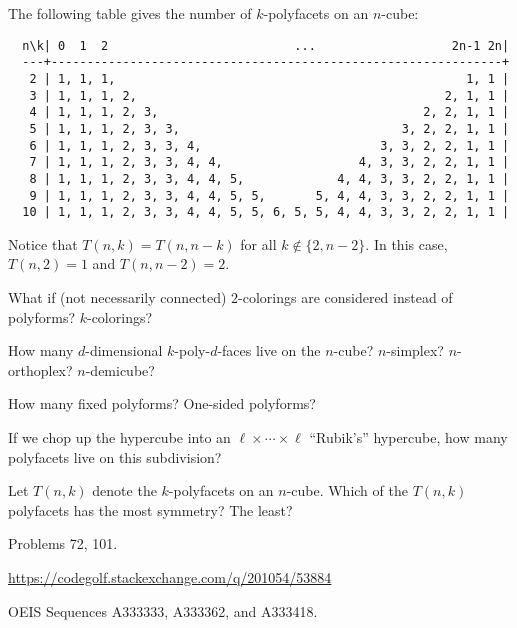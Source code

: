 \documentclass{article}
\begin{document}
\begin{note}
  The following table gives the number of $k$-polyfacets on an $n$-cube:
  \begin{verbatim}
  n\k| 0  1  2                          ...                   2n-1 2n|
  ---+---------------------------------------------------------------+
   2 | 1, 1, 1,                                                 1, 1 |
   3 | 1, 1, 1, 2,                                           2, 1, 1 |
   4 | 1, 1, 1, 2, 3,                                     2, 2, 1, 1 |
   5 | 1, 1, 1, 2, 3, 3,                               3, 2, 2, 1, 1 |
   6 | 1, 1, 1, 2, 3, 3, 4,                         3, 3, 2, 2, 1, 1 |
   7 | 1, 1, 1, 2, 3, 3, 4, 4,                   4, 3, 3, 2, 2, 1, 1 |
   8 | 1, 1, 1, 2, 3, 3, 4, 4, 5,             4, 4, 3, 3, 2, 2, 1, 1 |
   9 | 1, 1, 1, 2, 3, 3, 4, 4, 5, 5,       5, 4, 4, 3, 3, 2, 2, 1, 1 |
  10 | 1, 1, 1, 2, 3, 3, 4, 4, 5, 5, 6, 5, 5, 4, 4, 3, 3, 2, 2, 1, 1 |
  \end{verbatim}
  Notice that $T(n,k) = T(n,n-k)$ for all $k \not\in \{2, n-2\}$. In this case,
  $T(n,2) = 1$ and $T(n,n-2) = 2$.
\end{note}

\begin{related}
  \item What if (not necessarily connected) $2$-colorings are considered instead of polyforms? $k$-colorings?
  \item How many $d$-dimensional $k$-poly-$d$-faces live on the $n$-cube? $n$-simplex? $n$-orthoplex? $n$-demicube?
  \item How many fixed polyforms? One-sided polyforms?
  \item If we chop up the hypercube into an $\ell \times \cdots \times \ell$ ``Rubik's'' hypercube, how many polyfacets live on this subdivision?
  \item Let $T(n,k)$ denote the $k$-polyfacets on an $n$-cube.
    Which of the $T(n,k)$ polyfacets has the most symmetry? The least?
\end{related}
\begin{references}
  \item Problems 72, 101.
  \item \url{https://codegolf.stackexchange.com/q/201054/53884}
  \item OEIS Sequences A333333, A333362, and A333418.
\end{references}
\end{document}
